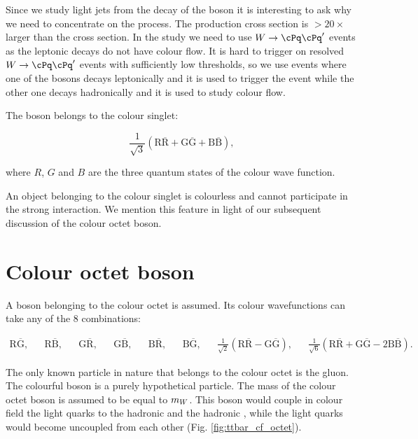 Since we study light jets from the decay of the \PW boson it is interesting to ask why we need to concentrate on the \ttbar process. The \PW production cross section is $>20\times$ larger than the \ttbar cross section. In the study we need to use  $\PW\rightarrow \cPq\cPq'$ events as the leptonic decays do not have colour flow. It is hard to trigger on resolved $\PW\rightarrow \cPq\cPq'$ events with sufficiently low \pt thresholds, so we use \ttbar events where one of the \PW bosons decays leptonically and it is used to trigger the event while the other one decays hadronically and it is used to study colour flow.

The \PW boson belongs to the colour singlet:

\begin{equation}
\frac{1}{\sqrt{3}}\left(\text{R}\overline{\text{R}}+\text{G}\overline{\text{G}}+\text{B}\overline{\text{B}}\right),
\end{equation}

where $R$, $G$ and $B$ are the three quantum states of the colour wave function.

An object belonging to the colour singlet is colourless and cannot participate in the strong interaction. We mention this feature in light of our subsequent discussion of the colour octet \PW boson.

\section{Colour octet \PW boson}

A \PW boson belonging to the colour octet is assumed. Its colour wavefunctions can take any of the 8 combinations:

\begin{align}
\text{R}\overline{\text{G}}, &&
\text{R}\overline{\text{B}}, &&
\text{G}\overline{\text{R}}, &&
\text{G}\overline{\text{B}}, &&
\text{B}\overline{\text{R}}, &&
\text{B}\overline{\text{G}}, &&
\frac{1}{\sqrt{2}}\left(\text{R}\overline{\text{R}}-\text{G}\overline{\text{G}}\right), &&
\frac{1}{\sqrt{6}}\left(\text{R}\overline{\text{R}}+\text{G}\overline{\text{G}}-2\text{B}\overline{\text{B}}\right).
\end{align}

The only known particle in nature that belongs to the colour octet is the gluon. The colourful \PW boson is a purely hypothetical particle. The mass of the colour octet \PW boson is assumed to be equal to $m_{W}$. This boson would couple in colour field the light quarks to the hadronic \cPqb and the hadronic \cPqt, while the light quarks would become uncoupled from each other (Fig. \ref{fig:ttbar_cf_octet}).

